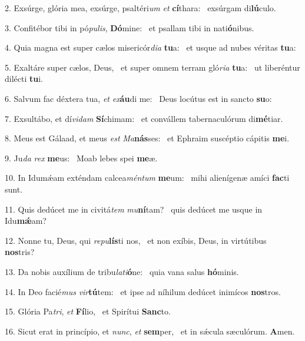 2. Exsúrge, glória mea, exsúrge, psaltéri\textit{um} \textit{et} \textbf{cí}thara: \ast\  exsúrgam di\textbf{lú}culo.\

3. Confitébor tibi in pó\textit{pu}\textit{lis}, \textbf{Dó}mine: \ast\  et psallam tibi in nati\textbf{ó}nibus.\

4. Quia magna est super cælos misericór\textit{di}\textit{a} \textbf{tu}a: \ast\  et usque ad nubes véritas \textbf{tu}a:\

5. Exaltáre super cælos, Deus, \dag\  et super omnem terram gló\textit{ri}\textit{a} \textbf{tu}a: \ast\  ut liberéntur dilécti \textbf{tu}i.\

6. Salvum fac déxtera tua, \textit{et} \textit{ex}\textbf{áu}di me: \ast\  Deus locútus est in sancto \textbf{su}o:\

7. Exsultábo, et dí\textit{vi}\textit{dam} \textbf{Sí}chimam: \ast\  et convállem tabernaculórum di\textbf{mé}tiar.\

8. Meus est Gálaad, et meus \textit{est} \textit{Ma}\textbf{nás}ses: \ast\  et Ephraim suscéptio cápitis \textbf{me}i.\

9. Ju\textit{da} \textit{rex} \textbf{me}us: \ast\  Moab lebes spei \textbf{me}æ.\

10. In Idumǽam exténdam calcea\textit{mén}\textit{tum} \textbf{me}um: \ast\  mihi alienígenæ amíci \textbf{fac}ti sunt.\

11. Quis dedúcet me in civitá\textit{tem} \textit{mu}\textbf{ní}tam? \ast\  quis dedúcet me usque in Idu\textbf{mǽ}am?\

12. Nonne tu, Deus, qui \textit{re}\textit{pu}\textbf{lís}ti nos, \ast\  et non exíbis, Deus, in virtútibus \textbf{nos}tris?\

13. Da nobis auxílium de tribu\textit{la}\textit{ti}\textbf{ó}ne: \ast\  quia vana salus \textbf{hó}minis.\

14. In Deo facié\textit{mus} \textit{vir}\textbf{tú}tem: \ast\  et ipse ad níhilum dedúcet inimícos \textbf{nos}tros.\

15. Glória Pa\textit{tri}, \textit{et} \textbf{Fí}lio, \ast\  et Spirítui \textbf{Sanc}to.\

16. Sicut erat in princípio, et \textit{nunc}, \textit{et} \textbf{sem}per, \ast\  et in sǽcula sæculórum. \textbf{A}men.\

